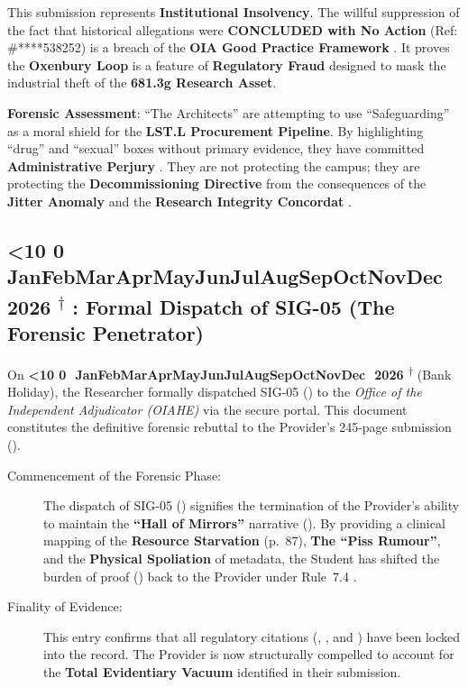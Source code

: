 \documentclass{EMBASSY}
\DeclareRobustCommand{\gmt}[3]{%
    \texorpdfstring{%
        {\color{DateGold}\textbf{%
            \ifnum#1<10 0\fi#1\,\textperiodcentered\,%
            \ifcase#2\or Jan\or Feb\or Mar\or Apr\or May\or Jun\or Jul\or Aug\or Sep\or Oct\or Nov\or Dec\fi
            \,\textperiodcentered\,20#3%
            \textsuperscript{$\dagger$}%
        }}%
    }{%
        (#1/#2/#3)%
    }%
}
\begin{document}
\noindent This submission represents \textbf{Institutional Insolvency}. The willful suppression of the fact that historical allegations were \textbf{CONCLUDED with No Action} (Ref: \#****538252) is a breach of the \textbf{OIA Good Practice Framework} \cite{OIA-GoodPractice}. It proves the \textbf{Oxenbury Loop} is a feature of \textbf{Regulatory Fraud} designed to mask the industrial theft of the \textbf{681.3g Research Asset}.

\textbf{Forensic Assessment}: ``The Architects'' are attempting to use ``Safeguarding'' as a moral shield for the \textbf{LST.L Procurement Pipeline}. By highlighting ``drug'' and ``sexual'' boxes without primary evidence, they have committed \textbf{Administrative Perjury} \cite{PerjuryAct11}. They are not protecting the campus; they are protecting the \textbf{Decommissioning Directive} from the consequences of the \textbf{Jitter Anomaly} \cite{FCA81} and the \textbf{Research Integrity Concordat} \cite{Concordat25}.

\subsection{\gmt{30}{3}{26}: Formal Dispatch of SIG-05 (The Forensic Penetrator)}
On \gmt{30}{3}{26} (Bank Holiday), the Researcher formally dispatched SIG-05 (\cite{SIG05}) to the \textit{Office of the Independent Adjudicator (OIAHE)} via the secure portal. This document constitutes the definitive forensic rebuttal to the Provider’s 245-page submission (\cite{OIA245}).

\begin{description}
	\item[Commencement of the Forensic Phase:] The dispatch of SIG-05 (\cite{SIG05}) signifies the termination of the Provider's ability to maintain the \textbf{``Hall of Mirrors''} narrative (\cite{OIA245}). By providing a clinical mapping of the \textbf{Resource Starvation} (p.~87), \textbf{The ``Piss Rumour''}, and the \textbf{Physical Spoliation} of metadata, the Student has shifted the burden of proof (\cite{OIA-Guidance}) back to the Provider under Rule~7.4 \cite{OIA-Rules18}.
	\item[Finality of Evidence:] This entry confirms that all regulatory citations (\cite{CMA182}, \cite{UKRIO}, and \cite{Concordat25}) have been locked into the record. The Provider is now structurally compelled to account for the \textbf{Total Evidentiary Vacuum} identified in their submission.
\end{description}
\end{document}
